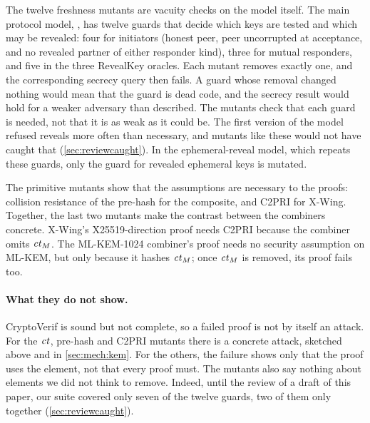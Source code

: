 The twelve freshness mutants are vacuity checks on the model itself. The
main protocol model, , has twelve guards that decide
which keys are tested and which may be revealed: four for initiators (honest peer, peer uncorrupted at
acceptance, and no revealed partner of either responder kind), three for
mutual responders, and five in the three RevealKey oracles. Each mutant
removes exactly one, and the corresponding secrecy query then fails. A guard
whose removal changed nothing would mean that the guard is dead code, and
the secrecy result would hold for a weaker adversary than described. The
mutants check that each guard is needed, not that it is as weak as it could
be. The first version of the model refused reveals more often than
necessary, and mutants like these would not have caught that
(\cref{sec:reviewcaught}). In the ephemeral-reveal model, which repeats
these guards, only the guard for revealed ephemeral keys is mutated.

The primitive mutants show that the assumptions are necessary to the
proofs: collision resistance of the pre-hash for the composite, and C2PRI for
X-Wing. Together, the last two mutants make the contrast between the
combiners concrete. X-Wing's X25519-direction proof needs C2PRI because the
combiner omits $\mathit{ct}_M$. The ML-KEM-1024 combiner's proof needs no security
assumption on ML-KEM, but only because it hashes $\mathit{ct}_M$; once $\mathit{ct}_M$ is
removed, its proof fails too.

\paragraph{What they do not show.} CryptoVerif is sound but not complete,
so a failed proof is not by itself an attack. For the $\mathit{ct}$, pre-hash and
C2PRI mutants there is a concrete attack, sketched above and in
\cref{sec:mech:kem}. For the others, the failure shows only that the proof
uses the element, not that every proof must. The mutants also say nothing
about elements we did not think to remove. Indeed, until the review of a
draft of this paper, our suite covered only seven of the twelve guards, two
of them only together (\cref{sec:reviewcaught}).
